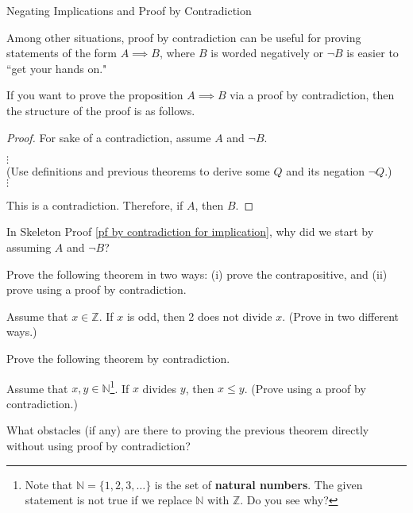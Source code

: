 \begin{section}{Negating Implications and Proof by Contradiction}
\begin{skeleton}
\end{skeleton}

Among other situations, proof by contradiction can be useful for proving statements of the form $A\implies B$, where $B$ is worded negatively or $\neg B$ is easier to ``get your hands on."  

\begin{skeleton}\label{pf by contradiction for implication}
If you want to prove the proposition $A\implies B$ via a proof by contradiction, then the structure of the proof is as follows.

\bigskip

\begin{textbox}
\begin{proof}
For sake of a contradiction, assume $A$ and $\neg B$.
\begin{center}
$\vdots$\\
(Use definitions and previous theorems to derive some $Q$ and its negation $\neg Q$.)\\
$\vdots$
\end{center}
\noindent This is a contradiction.  Therefore, if $A$, then $B$.
\end{proof}
\end{textbox}
\end{skeleton}

\begin{question}
In Skeleton Proof \ref{pf by contradiction for implication}, why did we start by assuming $A$ and $\neg B$?
\end{question}

Prove the following theorem in two ways: (i) prove the contrapositive, and (ii) prove using a proof by contradiction.

\begin{theorem}[*]
Assume that $x\in\mathbb{Z}$.  If $x$ is odd, then 2 does not divide $x$. (Prove in two different ways.)
\end{theorem}

Prove the following theorem by contradiction.

\begin{theorem}[*]
Assume that $x,y\in\mathbb{N}$\footnote{Note that $\mathbb{N}=\{1,2,3,\ldots\}$ is the set of \textbf{natural numbers}. The given statement is not true if we replace $\mathbb{N}$ with $\mathbb{Z}$.  Do you see why?}.  If $x$ divides $y$, then $x\leq y$. (Prove using a proof by contradiction.)
\end{theorem}

\begin{question}
What obstacles (if any) are there to proving the previous theorem directly without using proof by contradiction?
\end{question}

\end{section}
